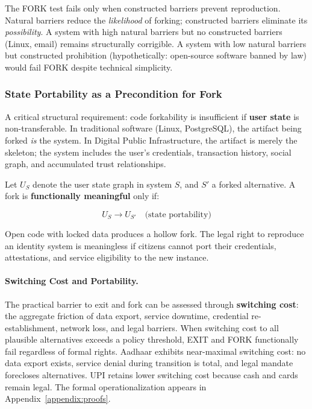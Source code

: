 \documentclass{article}
\begin{document}
The FORK test fails only when constructed barriers prevent reproduction. Natural barriers reduce the \textit{likelihood} of forking; constructed barriers eliminate its \textit{possibility}. A system with high natural barriers but no constructed barriers (Linux, email) remains structurally corrigible. A system with low natural barriers but constructed prohibition (hypothetically: open-source software banned by law) would fail FORK despite technical simplicity.

\subsubsection{State Portability as a Precondition for Fork}

A critical structural requirement: code forkability is insufficient if \textbf{user state} is non-transferable. In traditional software (Linux, PostgreSQL), the artifact being forked \textit{is} the system. In Digital Public Infrastructure, the artifact is merely the skeleton; the system includes the user's credentials, transaction history, social graph, and accumulated trust relationships.

Let $U_S$ denote the user state graph in system $S$, and $S'$ a forked alternative. A fork is \textbf{functionally meaningful} only if:

\begin{equation}
U_S \to U_{S'} \quad \text{(state portability)}
\label{eq:state-portability}
\end{equation}

Open code with locked data produces a hollow fork. The legal right to reproduce an identity system is meaningless if citizens cannot port their credentials, attestations, and service eligibility to the new instance.

\paragraph{Switching Cost and Portability.} The practical barrier to exit and fork can be assessed through \textbf{switching cost}: the aggregate friction of data export, service downtime, credential re-establishment, network loss, and legal barriers. When switching cost to all plausible alternatives exceeds a policy threshold, EXIT and FORK functionally fail regardless of formal rights. Aadhaar exhibits near-maximal switching cost: no data export exists, service denial during transition is total, and legal mandate forecloses alternatives. UPI retains lower switching cost because cash and cards remain legal. The formal operationalization appears in Appendix~\ref{appendix:proofs}.
\end{document}

